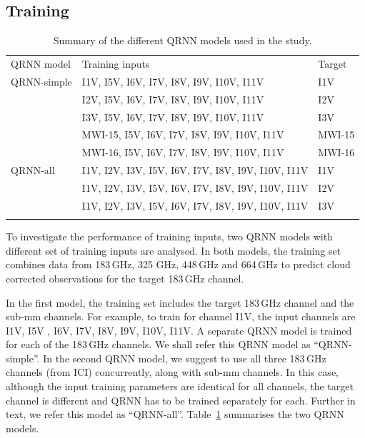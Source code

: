 \documentclass[amt, manuscript]{copernicus}
\begin{document}
\subsection{Training}
%
\begin{table}[t]
\label{tab:QRNN_models}	
\caption{Summary of the different QRNN models used in the study.}
\begin{tabular}{lll}
\tophline
QRNN model & Training inputs & Target \\
\middlehline
QRNN-simple & I1V, I5V, I6V, I7V, I8V, I9V, I10V, I11V 			 & I1V\\
			& I2V, I5V, I6V, I7V, I8V, I9V, I10V, I11V 			 & I2V\\
			& I3V, I5V, I6V, I7V, I8V, I9V, I10V, I11V 			 & I3V\\
			& MWI-15, I5V, I6V, I7V, I8V, I9V, I10V, I11V 		 & MWI-15\\	
			& MWI-16, I5V, I6V, I7V, I8V, I9V, I10V, I11V 		 & MWI-16\\
QRNN-all    & I1V, I2V, I3V, I5V, I6V, I7V, I8V, I9V, I10V, I11V & I1V\\	
			& I1V, I2V, I3V, I5V, I6V, I7V, I8V, I9V, I10V, I11V & I2V\\	
			& I1V, I2V, I3V, I5V, I6V, I7V, I8V, I9V, I10V, I11V & I3V\\
			
\bottomhline
\end{tabular}
\belowtable{} %
\end{table}
To investigate the performance of training inputs, two QRNN models with different set of training inputs are analysed. In both models, the training set combines data from 183\,GHz, 325 GHz, 448\,GHz and 664\,GHz to predict cloud corrected observations for the target 183\,GHz channel.

In the first model, the training set includes the target 183\,GHz channel and the sub-mm channels. For example, to train for channel I1V, the input channels are I1V, I5V , I6V, I7V, I8V, I9V, I10V, I11V. A separate QRNN model is trained for each of the 183\,GHz channels. We shall refer this QRNN model as ``QRNN-simple''. In the second QRNN model, we suggest to use all three 183\,GHz channels (from ICI) concurrently, along with sub-mm channels. In this case, although the input training parameters are identical for all channels, the target channel is different and QRNN has to be trained separately for each. Further in text, we refer this model as ``QRNN-all''. Table~\ref{tab:QRNN_models} summarises the two QRNN models. 
   
\end{document}
